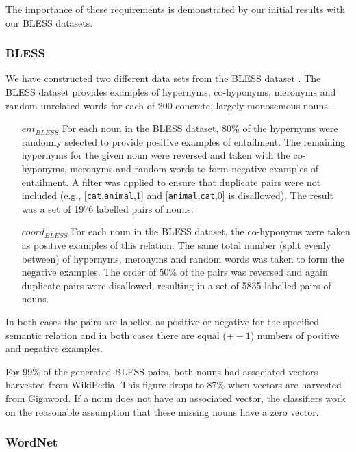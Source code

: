 \documentclass[11pt]{article}
\begin{document}
The importance of these requirements is demonstrated by our initial results with our BLESS datasets.

\subsubsection{BLESS}
We have constructed two different data sets from the BLESS dataset \cite{Baroni2011}.  The BLESS dataset provides examples of hypernyms, co-hyponyms, meronyms and random unrelated words for each of 200 concrete, largely monosemous nouns.

\begin{itemize}
\item[$ent_{BLESS}$]{For each noun in the BLESS dataset, 80\% of the hypernyms were randomly selected to provide positive examples of entailment.  The remaining hypernyms for the given noun were reversed and taken with the co-hyponyms, meronyms and random words to form negative examples of entailment.  A filter was applied to ensure that duplicate pairs were not included (e.g., [\texttt{cat},\texttt{animal},1] and [\texttt{animal},\texttt{cat},0] is disallowed). The result was a set of 1976 labelled pairs of nouns.}
\item[$coord_{BLESS}$]{For each noun in the BLESS dataset, the co-hyponyms were taken as positive examples of this relation.  The same total number (split evenly between) of hypernyms, meronyms and random words was taken to form the negative examples.  The order of 50\% of the pairs was reversed and again duplicate pairs were disallowed, resulting in a set of 5835 labelled pairs of nouns.}
\end{itemize}

In both cases the pairs are labelled as positive or negative for the specified semantic relation and in both cases there are equal ($+-1$) numbers of positive and negative examples.

For 99\% of the generated BLESS pairs, both nouns had associated vectors harvested from WikiPedia.   This figure drops to 87\% when vectors are harvested from Gigaword. If a noun does not have an associated vector, the classifiers work on the reasonable assumption that these missing nouns have a zero vector.  

\subsubsection{WordNet}
\end{document}
